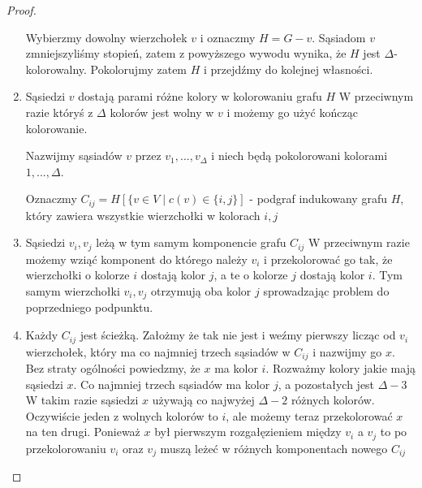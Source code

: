 \begin{proof}
\begin{enumerate}
		      Wybierzmy dowolny wierzchołek $v$ i oznaczmy $H = G - v$.
		      Sąsiadom $v$ zmniejszyliśmy stopień, zatem z powyższego wywodu wynika, że $H$ jest $\Delta$-kolorowalny.
		      Pokolorujmy zatem $H$ i przejdźmy do kolejnej własności.

		\item Sąsiedzi $v$ dostają parami różne kolory w kolorowaniu grafu $H$
		      W przeciwnym razie któryś z $\Delta$ kolorów jest wolny w $v$ i możemy go użyć kończąc kolorowanie.

		      Nazwijmy sąsiadów $v$ przez $v_1, ..., v_\Delta$ i niech będą pokolorowani kolorami $1, ..., \Delta$.

		      Oznaczmy $C_{ij} = H[\{v \in V \mid c(v) \in \{i, j\}]$ - podgraf indukowany
		      grafu $H$, który zawiera wszystkie wierzchołki w kolorach $i, j$

		\item Sąsiedzi $v_i, v_j$ leżą w tym samym komponencie grafu $C_{ij}$
		      W przeciwnym razie możemy wziąć komponent do którego należy $v_i$
		      i przekolorować go tak, że wierzchołki o kolorze $i$ dostają kolor $j$,
		      a te o kolorze $j$ dostają kolor $i$. Tym samym wierzchołki $v_i, v_j$
		      otrzymują oba kolor $j$ sprowadzając problem do poprzedniego podpunktu.

		\item Każdy $C_{ij}$ jest ścieżką.
		      Założmy że tak nie jest i weźmy pierwszy licząc od $v_i$ wierzchołek, który ma co najmniej trzech sąsiadów w $C_{ij}$ i nazwijmy go $x$.
		      Bez straty ogólności powiedzmy, że $x$ ma kolor $i$.
		      Rozważmy kolory jakie mają sąsiedzi $x$.
		      Co najmniej trzech sąsiadów ma kolor $j$, a pozostałych jest $\Delta - 3$
		      W takim razie sąsiedzi $x$ używają co najwyżej $\Delta - 2$ różnych kolorów. Oczywiście jeden z wolnych kolorów to $i$, ale możemy teraz przekolorować $x$ na ten drugi.
		      Ponieważ $x$ był pierwszym rozgałęzieniem między $v_i$ a $v_j$
		      to po przekolorowaniu $v_i$ oraz $v_j$ muszą leżeć w różnych komponentach nowego $C_{ij}$


\end{enumerate}
\end{proof}
